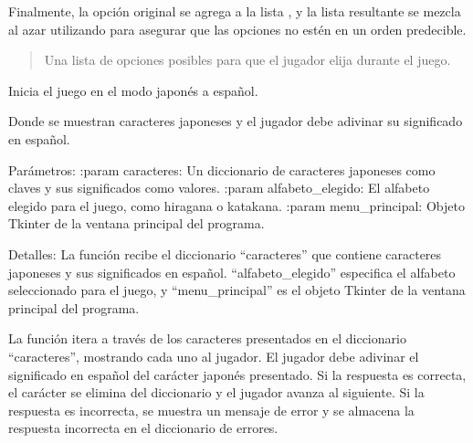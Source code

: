 \documentclass[letterpaper,10pt,spanish]{sphinxmanual}
\begin{document}
\begin{fulllineitems}
\begin{fulllineitems}
\sphinxAtStartPar
Finalmente, la opción original se agrega a la lista , y la lista resultante se
mezcla al azar utilizando  para asegurar que las opciones no estén en un orden predecible.
\begin{quote}\begin{description}
\sphinxAtStartPar
Una lista de opciones posibles para que el jugador elija durante el juego.

\end{description}\end{quote}

\end{fulllineitems}


\begin{fulllineitems}
\label{\detokenize{juego:juego.Juego.japones_a_espanol}}
\pysigstartsignatures
{}
\pysigstopsignatures
\sphinxAtStartPar
Inicia el juego en el modo japonés a español.

\sphinxAtStartPar
Donde se muestran caracteres japoneses y el jugador debe adivinar su significado en español.

\sphinxAtStartPar
Parámetros:
:param caracteres: Un diccionario de caracteres japoneses como claves y sus significados como valores.
:param alfabeto\_elegido: El alfabeto elegido para el juego, como hiragana o katakana.
:param menu\_principal: Objeto Tkinter de la ventana principal del programa.

\sphinxAtStartPar
Detalles:
La función recibe el diccionario “caracteres” que contiene caracteres japoneses y sus significados
en español. “alfabeto\_elegido” especifica el alfabeto seleccionado para el juego, y “menu\_principal” es el
objeto Tkinter de la ventana principal del programa.

\sphinxAtStartPar
La función itera a través de los caracteres presentados en el diccionario “caracteres”, mostrando cada uno al
jugador. El jugador debe adivinar el significado en español del carácter japonés presentado. Si la respuesta
es correcta, el carácter se elimina del diccionario y el jugador avanza al siguiente. Si la respuesta es
incorrecta, se muestra un mensaje de error y se almacena la respuesta incorrecta en el diccionario de errores.


\end{fulllineitems}
\end{fulllineitems}
\end{document}

